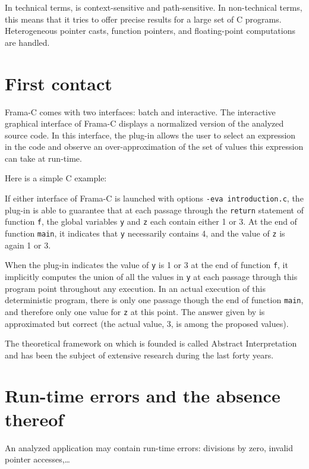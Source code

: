 \documentclass{frama-c-book}
\begin{document}
In technical terms, \Eva{} is context-sensitive and
path-sensitive. In non-technical terms, this means that it tries to
offer precise results for a large set of C programs. Heterogeneous
pointer casts, function pointers, and floating-point computations are
handled.

\section{First contact}
Frama-C comes with two interfaces: batch and interactive.
The interactive graphical interface of Frama-C displays
a normalized version of the analyzed source code.
In this interface, the \Eva{} plug-in allows the user
to select an expression in the
code and observe an over-approximation of the set of
values this expression can take at run-time.

Here is a simple C example:

If either interface of Frama-C is launched with options
\lstinline|-eva introduction.c|,
the \Eva{} plug-in is able to guarantee that at each passage through
the \lstinline|return| statement of
function \lstinline|f|, the global variables \lstinline+y+ and
\lstinline+z+ each contain either 1 or 3.
At the end of function  \lstinline|main|,
it indicates that  \lstinline|y|
necessarily contains  4, and the value of  \lstinline|z| is again 1 or 3.

When the plug-in indicates the value of \lstinline|y| is 1 or 3
at the end of function \lstinline|f|, it implicitly computes the union
of all the values in \lstinline|y|
at each passage through this program point throughout any execution.
In an actual execution of this deterministic program,
there is only one passage though the end
of function  \lstinline|main|, and therefore only one value for \lstinline|z|
at this point.
The answer given by \Eva{} is approximated but correct (the actual
value, 3, is among the proposed values).

The theoretical framework on which \Eva{} is founded is called
Abstract Interpretation and has been the subject of extensive research
during the last forty years.

\section{Run-time errors and the absence thereof}

An analyzed application may contain run-time errors: divisions by zero,
invalid pointer accesses,\ldots
\end{document}
